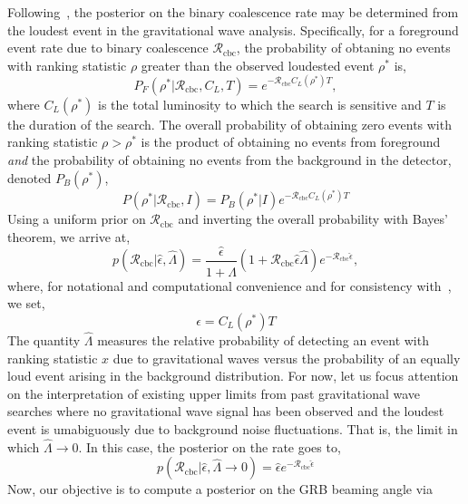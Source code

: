 \documentclass[twocolumn,nofootinbib]{revtex4}
\newcommand{\gw}{gravitational wave }
\newcommand{\gws}{gravitational waves }
\newcommand{\cbcrate}{{{\mathcal R}_{\mathrm{cbc}}}}
\newcommand{\rhostar}{{\rho^*}}
\begin{document}
Following~\cite{Biswas09,BradyFairhurst08}, the posterior on the binary
coalescence rate may be determined from the loudest event in the \gw
analysis.  Specifically, for a foreground event rate due to  binary coalescence
$\cbcrate$, the probability of obtaning no events with ranking statistic $\rho$
greater than the observed loudested event $\rhostar$ is,
%
\begin{equation}
P_F(\rhostar | \cbcrate, C_L, T) = e^{-\cbcrate C_L(\rhostar) T},
\end{equation}
%
where $C_L(\rhostar)$ is the total luminosity to which the search is sensitive
and $T$ is the duration of the search.  The overall probability of obtaining
zero events with ranking statistic $\rho>\rhostar$ is the product of obtaining
no events from foreground \emph{and} the probability of obtaining no events from
the background in the detector, denoted $P_B(\rhostar)$,
%
\begin{equation}
P(\rhostar|\cbcrate,I) = P_B(\rhostar|I)e^{-\cbcrate C_L(\rhostar) T}
\end{equation}
%
Using a uniform prior on $\cbcrate$ and inverting the overall probability with
Bayes' theorem, we arrive at,
%
\begin{equation}\label{eq:loudestEventPosterior}
p(\cbcrate | \hat{\epsilon}, \hat{\Lambda}) =
\frac{\hat{\epsilon}}{1+\hat{\Lambda}}
\left(1 + \cbcrate \hat{\epsilon}\hat{\Lambda}\right) e^{-\cbcrate \hat{\epsilon}},
\end{equation}
%
where, for notational and computational convenience and for consistency
with~\cite{Biswas09}, we set,
%
\begin{equation}
\epsilon = C_L(\rhostar) T
\end{equation}
%
The quantity $\hat{\Lambda}$ measures the relative probability of detecting an
event with ranking statistic $x$ due to \gws versus the probability of an
equally loud event arising in the background distribution.  For now, let us
focus attention on the interpretation of existing upper limits from past \gw
searches where no \gw signal has been observed and the loudest event is
umabiguously due to background noise fluctuations.  That is, the limit in which
$\hat{\Lambda} \rightarrow 0$.  In this case, the posterior on the rate goes to,
%
\begin{equation}
\label{eq:nullPosterior}
p(\cbcrate | \hat{\epsilon}, \hat{\Lambda} \rightarrow 0) = \hat{\epsilon} e^{-\cbcrate
\hat{\epsilon}} 
\end{equation}
%
Now, our objective is to compute a posterior on the GRB beaming angle via
\end{document}
